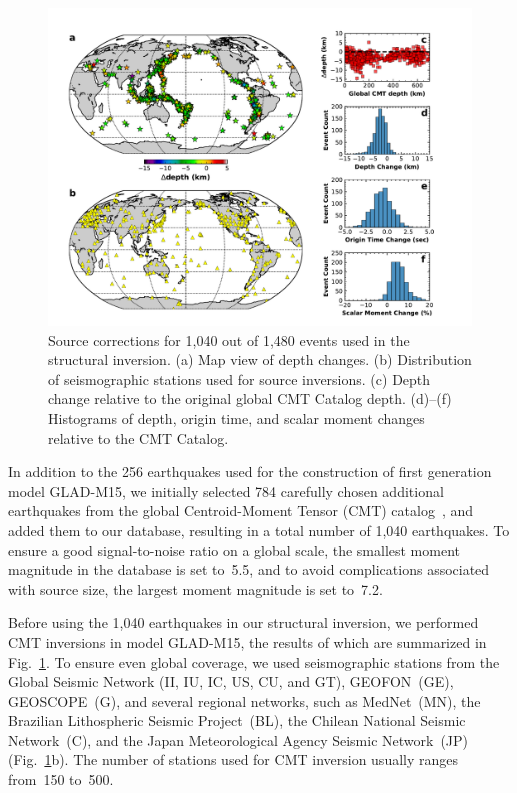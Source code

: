 \documentclass[extra,mreferee]{gji}
\begin{document}
\begin{figure}
  \centering
  \includegraphics[width=\textwidth]{figures/source_corrections.pdf}
  \caption{Source corrections for 1,040 out of 1,480 events used in the structural inversion. (a) Map view of depth changes. (b) Distribution of seismographic stations used for source inversions. (c) Depth change relative to the original global CMT Catalog depth. (d)--(f) Histograms of depth, origin time, and scalar moment changes relative to the CMT Catalog.
  }
  \label{fig:source_correction}
\end{figure}

In addition to the 256 earthquakes used for the construction of first generation model GLAD-M15, we initially selected 784 carefully chosen additional earthquakes from the global Centroid-Moment Tensor (CMT) catalog~\citep[e.g.,][]{Ekstrom12},
and added them to our database, resulting in a total number of 1,040 earthquakes.
To ensure a good signal-to-noise ratio on a global scale,
the smallest moment magnitude in the database is set to~5.5,
and to avoid complications associated with source size,
the largest moment magnitude is set to~7.2.

Before using the 1,040 earthquakes in our structural inversion,
we performed CMT inversions in model GLAD-M15,
the results of which are summarized in Fig.~\ref{fig:source_correction}.
To ensure even global coverage,
we used seismographic stations from the  Global Seismic Network (II, IU, IC, US, CU, and GT),
GEOFON~(GE), GEOSCOPE~(G), and several regional networks, such as MedNet~(MN),
the Brazilian Lithospheric Seismic Project~(BL), the Chilean National Seismic Network~(C),
and the Japan Meteorological Agency Seismic Network~(JP) (Fig.~\ref{fig:source_correction}b).
The number of stations used for CMT inversion usually ranges
from~150 to~500.
\end{document}
